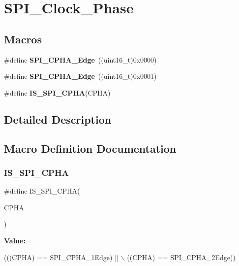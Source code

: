 \section{S\+P\+I\+\_\+\+Clock\+\_\+\+Phase}
\label{group__SPI__Clock__Phase}
\subsection*{Macros}
\begin{DoxyCompactItemize}
\item 
\#define \textbf{ S\+P\+I\+\_\+\+C\+P\+H\+A\+\_\+Edge}~((uint16\+\_\+t)0x0000)
\item 
\#define \textbf{ S\+P\+I\+\_\+\+C\+P\+H\+A\+\_\+Edge}~((uint16\+\_\+t)0x0001)
\item 
\#define \textbf{ I\+S\+\_\+\+S\+P\+I\+\_\+\+C\+P\+HA}(C\+P\+HA)
\end{DoxyCompactItemize}


\subsection{Detailed Description}


\subsection{Macro Definition Documentation}
\mbox{\label{group__SPI__Clock__Phase_ga6441f08edf79dd5b243c54b888d3cbf7}} 
\subsubsection{I\+S\+\_\+\+S\+P\+I\+\_\+\+C\+P\+HA}
{\footnotesize\ttfamily \#define I\+S\+\_\+\+S\+P\+I\+\_\+\+C\+P\+HA(\begin{DoxyParamCaption}\item[{}]{C\+P\+HA }\end{DoxyParamCaption})}

{\bfseries Value\+:}
\begin{DoxyCode}
(((CPHA) == SPI_CPHA_1Edge) || \(\backslash\)
                           ((CPHA) == SPI_CPHA_2Edge))
\end{DoxyCode}


